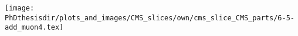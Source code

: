 %
%
%

\begin{frame}
\addtocounter{framenumber}{-1}
\transdissolve[duration=2]
\begin{center}
\texttt{[image: \\PhDthesisdir/plots\_and\_images/CMS\_slices/own/cms\_slice\_CMS\_parts/6-5-add\_muon4.tex]}
\end{center}
\end{frame}


